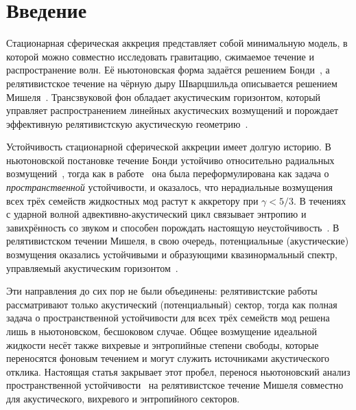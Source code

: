 \documentclass[12pt,a4paper,preprint,nopreprintline]{elsarticle}
\begin{document}
\section{Введение}
\label{sec:introduction}

Стационарная сферическая аккреция представляет собой минимальную модель, в которой можно совместно исследовать гравитацию, сжимаемое течение и распространение волн. Её ньютоновская форма задаётся решением Бонди~\cite{BondiH_OnSphericallySymmetricalAccretion_1953}, а релятивистское течение на чёрную дыру Шварцшильда описывается решением Мишеля~\cite{MichelFC_AccretionOfMatterByCondensedObjects_1972}. Трансзвуковой фон обладает акустическим горизонтом, который управляет распространением линейных акустических возмущений и порождает эффективную релятивистскую акустическую геометрию~\cite{MoncriefV_StabilityOfStationarySphericalAccretionOntoASchwarzschildBlackHole_1980,BilicN_RelativisticAcousticGeometry_1999}.

Устойчивость стационарной сферической аккреции имеет долгую историю. В ньютоновской постановке течение Бонди устойчиво относительно радиальных возмущений~\cite{GarlickAR_TheStabilityOfBondiAccretion_1979,PettersonJA_SilkJ_OstrikerJP_VariationsOnAShpericallySymmetricalAccretionFlow_1980}, тогда как в работе~\cite{KovalenkoIG_EreminMA_SpatialInstabilityOfSphericalAccretion_1998} она была переформулирована как задача о \emph{пространственной} устойчивости, и оказалось, что нерадиальные возмущения всех трёх семейств жидкостных мод растут к аккретору при $\gamma<5/3$. В течениях с ударной волной адвективно-акустический цикл связывает энтропию и завихрённость со звуком и способен порождать настоящую неустойчивость~\cite{FoglizzoT_TaggerM_EntropicAcousticInstabilityInShockedAccretionFlows_2000,FoglizzoT_EntropicAcousticInstabilityOfShockedBondiAccretionIWhatDoesPerturbedBondiAccretionSoundLike_2000}. В релятивистском течении Мишеля, в свою очередь, потенциальные (акустические) возмущения оказались устойчивыми и образующими квазинормальный спектр, управляемый акустическим горизонтом~\cite{MoncriefV_StabilityOfStationarySphericalAccretionOntoASchwarzschildBlackHole_1980,ChaverraE_MoralesMD_SarbachO_QuasinormalAcousticOscillationsInTheMichelFlow_2015}.

Эти направления до сих пор не были объединены: релятивистские работы рассматривают только акустический (потенциальный) сектор, тогда как полная задача о пространственной устойчивости для всех трёх семейств мод решена лишь в ньютоновском, бесшоковом случае. Общее возмущение идеальной жидкости несёт также вихревые и энтропийные степени свободы, которые переносятся фоновым течением и могут служить источниками акустического отклика. Настоящая статья закрывает этот пробел, перенося ньютоновский анализ пространственной устойчивости~\cite{KovalenkoIG_EreminMA_SpatialInstabilityOfSphericalAccretion_1998} на релятивистское течение Мишеля совместно для акустического, вихревого и энтропийного секторов.
\end{document}
